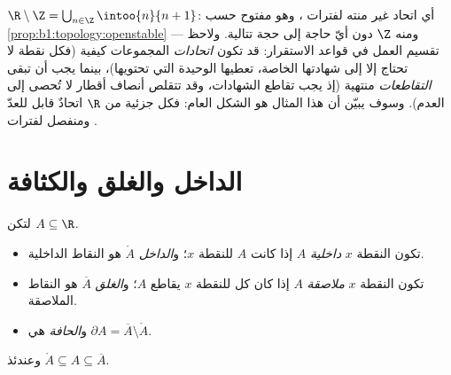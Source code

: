 \begin{example}\label{ex:b1:topology:rminusz}
$\R \setminus \Z = \bigcup_{n \in \Z} \intoo{n}{n+1}$: أي
اتحاد غير منته لفترات ، وهو مفتوح حسب
\cref{prop:b1:topology:openstable} --- ومنه  $\Z$  دون أيّ حاجة إلى
حجة تتالية. ولاحظ تقسيم العمل في
قواعد الاستقرار: قد تكون \emph{اتحادات} المجموعات  كيفية
(فكل نقطة لا تحتاج إلا إلى شهادتها الخاصة، تعطيها  الوحيدة
التي تحتويها)، بينما يجب أن تبقى \emph{التقاطعات} منتهية
(إذ يجب تقاطع الشهادات، وقد تتقلص أنصاف أقطار لا تُحصى
إلى العدم). وسوف يبيّن  أن هذا
المثال هو الشكل العام: فكل  جزئية  من $\R$
اتحادٌ قابل للعدّ ومنفصل لفترات .
\end{example}

\section{الداخل والغلق والكثافة}

\begin{definition}\label{def:b1:topology:closure}
لتكن $A \subseteq \R$.
\begin{itemize}
  \item تكون النقطة $x$ \emph{داخلية}  $A$ إذا كانت $A$
         للنقطة $x$؛ و\emph{الداخل}
        $\mathring{A}$ هو  النقاط الداخلية.
  \item تكون النقطة $x$ \emph{ملاصقة}  $A$ إذا كان كل 
        للنقطة $x$ يقاطع $A$؛ و\emph{الغلق}
        $\overline{A}$ هو  النقاط الملاصقة.
  \item و\emph{الحافة} هي $\partial A = \overline A \setminus
        \mathring A$.
\end{itemize}
وعندئذ $\mathring A \subseteq A \subseteq \overline A$.
\end{definition}

